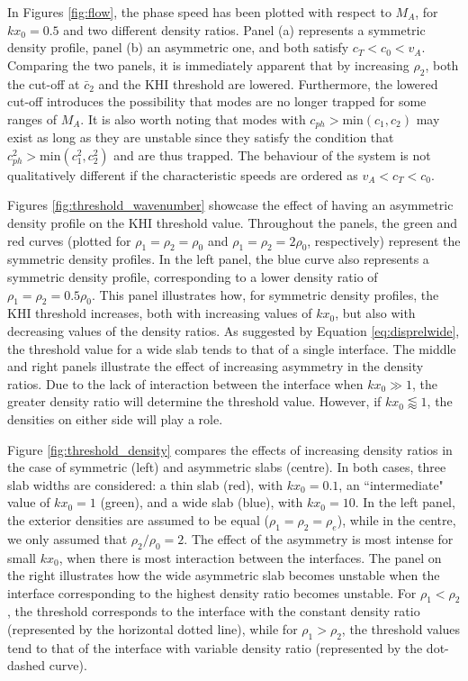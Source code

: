 \documentclass[12pt]{ociamthesis}
\begin{document}
In Figures \ref{fig:flow}, the phase speed has been plotted with respect to $M_A$, for $k x_0 = 0.5$ and two different density ratios.
Panel (a) represents a symmetric density profile, panel (b) an asymmetric one, and both satisfy $c_T < c_0 < v_A$.
Comparing the two panels, it is immediately apparent that by increasing $\rho_2$, both the cut-off at $\bar c_2$ and the KHI threshold are lowered.
Furthermore, the lowered cut-off introduces the possibility that modes are no longer trapped for some ranges of $M_A$.
It is also worth noting that modes with $c_{ph} > \textrm{min}(c_1, c_2)$ may exist as long as they are unstable since they satisfy the condition that $c_{ph}^2 > \textrm{min}(c_1^2, c_2^2)$ and are thus trapped.
The behaviour of the system is not qualitatively different if the characteristic speeds are ordered as $v_A < c_T < c_0$.

Figures \ref{fig:threshold_wavenumber} showcase the effect of having an asymmetric density profile on the KHI threshold value.
Throughout the panels, the green and red curves (plotted for $\rho_1 = \rho_2 =  \rho_0$ and $\rho_1 = \rho_2 = 2 \rho_0$, respectively) represent the symmetric density profiles.
In the left panel, the blue curve also represents a symmetric density profile, corresponding to a lower density ratio of $\rho_1 = \rho_2 = 0.5 \rho_0$.
This panel illustrates how, for symmetric density profiles, the KHI threshold increases, both with increasing values of $k x_0$, but also with decreasing values of the density ratios.
As suggested by Equation \eqref{eq:disprelwide}, the threshold value for a wide slab tends to that of a single interface.
The middle and right panels illustrate the effect of increasing asymmetry in the density ratios.
Due to the lack of interaction between the interface when $k x_0 \gg 1$, the greater density ratio will determine the threshold value. However, if $k x_0 \lessapprox 1$, the densities on either side will play a role.

Figure \ref{fig:threshold_density} compares the effects of increasing density ratios in the case of symmetric (left) and asymmetric slabs (centre).
In both cases, three slab widths are considered: a thin slab (red), with $k x_0 = 0.1$, an ``intermediate" value of $k x_0 = 1$ (green), and a wide slab (blue), with $k x_0 = 10$.
In the left panel, the exterior densities are assumed to be equal ($\rho_1 = \rho_2 = \rho_e$), while in the centre, we only assumed that $\rho_2/\rho_0 = 2$. 
The effect of the asymmetry is most intense for small $k x_0$, when there is most interaction between the interfaces.
The panel on the right illustrates how the wide asymmetric slab becomes unstable when the interface corresponding to the highest density ratio becomes unstable.
For $\rho_1 < \rho_2$, the threshold corresponds to the interface with the constant density ratio (represented by the horizontal dotted line), while for $\rho_1 > \rho_2$, the threshold values tend to that of the interface with variable density ratio (represented by the dot-dashed curve).
\end{document}
